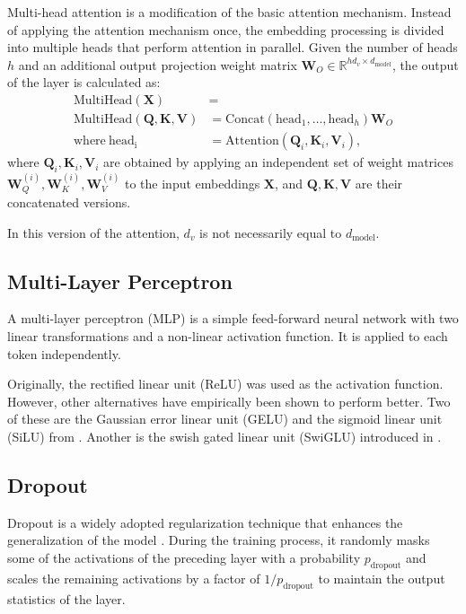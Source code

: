 Multi-head attention is a modification of the basic attention mechanism. Instead of applying the attention mechanism once, the embedding processing is divided into multiple heads that perform attention in parallel. Given the number of heads \(h\) and an additional output projection weight matrix \(\mathbf{W}_O \in \mathbb{R}^{hd_v \times d_{\mathrm{model}}}\), the output of the layer is calculated as:
\begin{align}
    \mathrm{MultiHead}(\mathbf{X}) &= \\ \mathrm{MultiHead}(\mathbf{Q}, \mathbf{K}, \mathbf{V}) &= \mathrm{Concat}(\mathrm{head}_1, \ldots, \mathrm{head}_h) \mathbf{W}_O \\
    \text{where}~\mathrm{head_i} &= \mathrm{Attention}(\mathbf{Q}_i, \mathbf{K}_i, \mathbf{V}_i),
\end{align}
where \(\mathbf{Q}_i, \mathbf{K}_i, \mathbf{V}_i\) are obtained by applying an independent set of weight matrices \(\mathbf{W}_Q^{(i)}, \mathbf{W}_K^{(i)}, \mathbf{W}_V^{(i)}\) to the input embeddings \(\mathbf{X}\), and \(\mathbf{Q}, \mathbf{K}, \mathbf{V}\) are their concatenated versions.

In this version of the attention, \(d_v\) is not necessarily equal to \(d_{\mathrm{model}}\).

\subsection{Multi-Layer Perceptron}

A multi-layer perceptron (MLP) is a simple feed-forward neural network with two linear transformations and a non-linear activation function. It is applied to each token independently.

Originally, the rectified linear unit (ReLU) was used as the activation function. However, other alternatives have empirically been shown to perform better. Two of these are the Gaussian error linear unit (GELU) and the sigmoid linear unit (SiLU) from \citet{hendrycks2016}. Another is the swish gated linear unit (SwiGLU) introduced in \citet{shazeer2020}.

\subsection{Dropout}

Dropout is a widely adopted regularization technique that enhances the generalization of the model \parencite{srivastava2014}. During the training process, it randomly masks some of the activations of the preceding layer with a probability \(p_{\mathrm{dropout}}\) and scales the remaining activations by a factor of \(1 / p_{\mathrm{dropout}}\) to maintain the output statistics of the layer.

